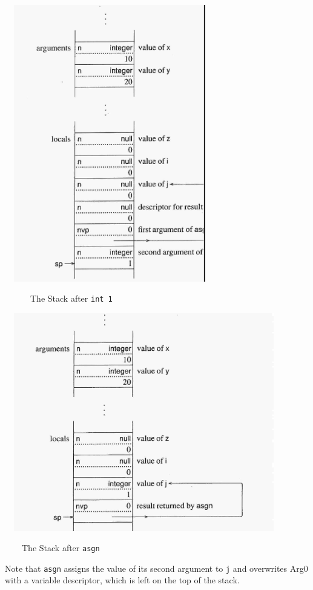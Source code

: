 \ \  \includegraphics[width=3.3134in,height=4.7457in]{ib-img/ib-img049.jpg} 


\ \ \ \ \ \ The Stack after \texttt{int 1}


\bigskip


\ \  \includegraphics[width=4.489in,height=3.7366in]{ib-img/ib-img050.jpg} 


\ \ \ \ The Stack after \texttt{asgn}


Note that \texttt{asgn} assigns the value of its second argument to
\texttt{j} and overwrites Arg0 with a variable descriptor, which is
left on the top of the stack.

